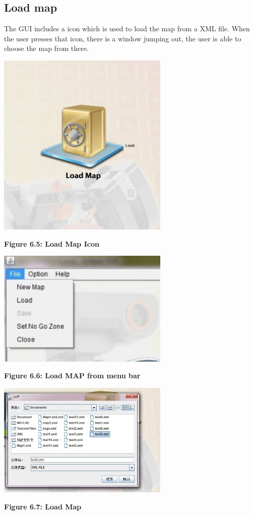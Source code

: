 \documentclass[11pt, a4paper]{report}
\begin{document}
\subsection{Load map}
The GUI includes a icon which is used to load the map from a XML file. When the user presses that icon, there is a window jumping out, the user is able to choose the map from there.
\begin{center}
 \includegraphics[width=8.20cm]{loadmap_quick}
\end{center}
\begin{center}
\textbf {Figure 6.5: Load Map Icon} \\[0.3cm]
\end{center}
\begin{center}
 \includegraphics[width=8.20cm]{Menu_file.jpg}
\end{center}
\begin{center}
\textbf {Figure 6.6: Load MAP from menu bar} \\[0.3cm]
\end{center}
\begin{center}
 \includegraphics[width=8.20cm]{LoadMap.jpg}
\end{center}
\begin{center}
\textbf {Figure 6.7: Load Map} \\[0.3cm]
\end{center}
\end{document}

